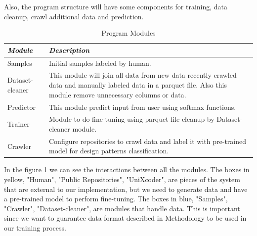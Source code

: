 \documentclass[conference]{IEEEtran}
\begin{document}
Also, the program structure will have some components for training, data cleanup, crawl additional data and prediction.

\begin{table}[htbp]
    \caption{Program Modules}
    \begin{center}
        \begin{tabular}{|m{2cm}|m{5.5cm}|}
            \hline
            \textbf\textbf{\textit{Module}}& \textbf{\textit{Description}} \\
            \hline 
            Samples & Initial samples labeled by human.  \\
            \hline 
            Dataset-cleaner & This module will join all data from new data recently crawled \newline 
                data and manually labeled data in a parquet file. \newline 
                Also this module remove unnecessary columns or data. \\
            \hline 
            Predictor & This module predict input from user using softmax functions. \\
            \hline 
            Trainer & Module to do fine-tuning using parquet file cleanup by Dataset-cleaner module. \\
            \hline
            Crawler & Configure repositories to crawl data and label it with pre-trained model \newline 
                for design patterns classification. \\
            \hline
        \end{tabular}
        \label{tab2}
    \end{center}
\end{table}

In the figure 1 we can see the interactions between all the modules. 
The boxes in yellow, "Human", "Public Repositories", "UniXcoder", are pieces of the system that are external to our implementation, 
but we need to generate data and have a pre-trained model to perform fine-tuning.
The boxes in blue, "Samples", "Crawler", "Dataset-cleaner", are modules that handle data. This is important since we want to guarantee data format described in Methodology to be used in our training process.
\end{document}
